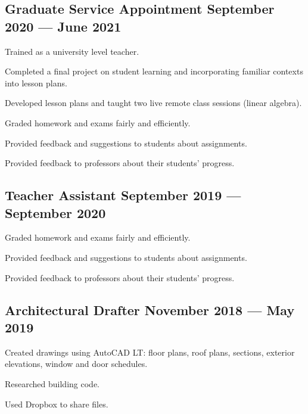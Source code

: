 \documentclass[letter,10pt]{article}
\begin{document}
\subsection{{Graduate Service Appointment \hfill September 2020 --- June 2021}}
\begin{zitemize}
    \item Trained as a university level teacher.
    \item Completed a final project on student learning and incorporating familiar contexts into lesson plans.
    \item Developed lesson plans and taught two live remote class sessions (linear algebra).
    \item Graded homework and exams fairly and efficiently.
    \item Provided feedback and suggestions to students about assignments.
    \item Provided feedback to professors about their students' progress.
\end{zitemize}

\subsection{{Teacher Assistant \hfill September 2019 --- September 2020}}
\begin{zitemize}
    \item Graded homework and exams fairly and efficiently.
    \item Provided feedback and suggestions to students about assignments.
    \item Provided feedback to professors about their students' progress.
\end{zitemize}

\subsection{{Architectural Drafter \hfill November 2018 --- May 2019}}
\begin{zitemize}
    \item Created drawings using AutoCAD LT: floor plans, roof plans, sections, exterior elevations, window and door schedules.
    \item Researched building code.
    \item Used Dropbox to share files.
\end{zitemize}
\end{document}
